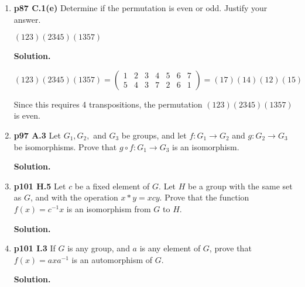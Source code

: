 \documentclass[11pt]{article}
\begin{document}
\begin{enumerate}
	{\bfseries Solution.}
	
	$\pi = \begin{pmatrix}
		1 & 2 & 3 & 4 & 5 & 6 & 7 & 8 \\
		7 & 4 & 1 & 5 & 6 & 2 & 3 & 8
	\end{pmatrix}
	= (173)(2456) = (17)(37)(24)(45)(56)$
	
	Since this requires 5 transpositions, the permutation $\pi$ is odd.

\item {\bfseries p87 C.1(e)} Determine if the permutation is even or odd. Justify your answer.

	$(123)(2345)(1357)$
  
	{\bfseries Solution.}
	
	$(123)(2345)(1357) = \begin{pmatrix}
		1 & 2 & 3 & 4 & 5 & 6 & 7 \\
		5 & 4 & 3 & 7 & 2 & 6 & 1
	\end{pmatrix} = (17)(14)(12)(15)$
	
	Since this requires 4 transpositions, the permutation $(123)(2345)(1357)$ is even.
  
\newpage

\item {\bfseries p97 A.3} Let $G_1, G_2,$ and $G_3$ be groups, and let $f : G_1 \rightarrow G_2$ and $g : G_2 \rightarrow G_3$ be isomorphisms. Prove that $g \circ f : G_1 \rightarrow G_3$ is an isomorphism.
  
	{\bfseries Solution.}

\item {\bfseries p101 H.5} Let $c$ be a fixed element of $G$. Let $H$ be a group with the same set as $G$, and with the operation $x * y = xcy$. Prove that the function $f(x) = c^{-1}x$ is an isomorphism from $G$ to $H$.
  
	{\bfseries Solution.}

\item {\bfseries p101 I.3} If $G$ is any group, and $a$ is any element of $G$, prove that $f(x) = axa^{-1}$ is an automorphism of $G$.
  
	{\bfseries Solution.}

\end{enumerate}
\end{document}
